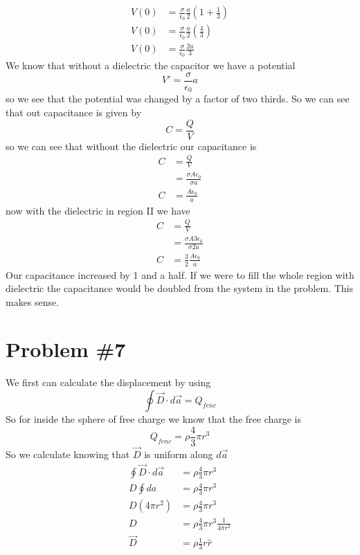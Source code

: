 \documentclass[11pt]{article}
\numberwithin{equation}{section}
\begin{document}
\begin{enumerate}[(a)]
\begin{align*}
V(0) &= \frac{\sigma}{\epsilon_0}\frac{a}{2}\left(1+\frac{1}{3}\right)\\
V(0) &= \frac{\sigma}{\epsilon_0}\frac{a}{2}\left(\frac{4}{3}\right)\\
V(0) &= \frac{\sigma}{\epsilon_0}\frac{2a}{3}
\end{align*}
We know that without a dielectric the capacitor we have a potential 
$$V'=\frac{\sigma}{\epsilon_0}a$$
so we see that the potential was changed by a factor of two thirds. So we can see that out capacitance is given by
$$C = \frac{Q}{V}$$
so we can see that without the dielectric our capacitance is
\begin{align*}
C &= \frac{Q}{V}\\
&= \frac{\sigma A\epsilon_0}{\sigma a}\\
C &= \frac{A\epsilon_0}{a}
\end{align*}
now with the dielectric in region II we have
\begin{align*}
C &= \frac{Q}{V}\\
&= \frac{\sigma A 3\epsilon_0}{\sigma 2a}\\
C &= \frac{3}{2}\frac{A\epsilon_0}{a}
\end{align*}
Our capacitance increased by 1 and a half. If we were to fill the whole region with dielectric the capacitance would be doubled from the system in the problem. This makes sense.
\end{enumerate}

\section{Problem \#7}

We first can calculate the displacement by using 
$$\oint\vec{D}\cdot d\vec{a} = Q_{fenc}$$
So for inside the sphere of free charge we know that the free charge is
$$Q_{fenc} = \rho\frac{4}{3}\pi r^3$$
So we calculate knowing that $\vec{D}$ is uniform along $d\vec{a}$
\begin{align*}
\oint\vec{D}\cdot d\vec{a} &= \rho\frac{4}{3}\pi r^3\\
D\oint da &= \rho\frac{4}{3}\pi r^3\\
D(4\pi r^2) &= \rho\frac{4}{3}\pi r^3\\
D &= \rho\frac{4}{3}\pi r^3\frac{1}{4\pi r^2}\\
\vec{D} &= \rho\frac{1}{3}r\hat{r}
\end{align*}
\end{document}
